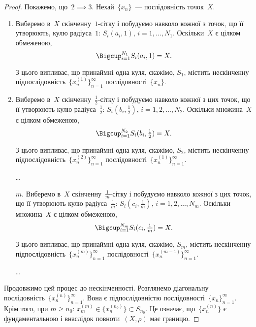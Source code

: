 \begin{proof}
Покажемо, що~$2 \implies 3$. Нехай~$\{x_n\}$~--- послідовність
точок~$X$.
\begin{enumerate}
\item Виберемо в~$X$ скінченну~$1$-сітку і побудуємо навколо
кожної з точок, що її утворюють, кулю радіуса~$1$:
$S_i(a_i, 1)$, $i = 1, \dots, N_1$. Оскільки~$X$ є цілком обмеженою,
\begin{equation*}
    \Bigcup_{i = 1}^{N_1} S_i(a_i, 1) = X.
\end{equation*}

З цього випливає, що принаймні одна куля, скажімо,
$S_1$, містить нескінченну підпослідовність~$\{x_n^{(1)}\}_{n = 1}^\infty$
послідовності~$\{x_n\}$.

\item Виберемо в~$X$ скінченну~$\frac{1}{2}$-сітку і побудуємо навколо
кожної з цих точок, що її утворюють кулю радіуса~$\frac{1}{2}$:
$S_i(b_i, \frac{1}{2})$, $i = 1, 2, \dots, N_2$. Оскільки множина~$X$ є цілком
обмеженою,
\begin{equation*}
    \Bigcup_{i = 1}^{N_2} S_i(b_i, \tfrac{1}{2}) = X.
\end{equation*}

З цього випливає, що принаймні одна куля, скажімо,
$S_2$, містить нескінченну підпослідовність~$\{x_n^{(2)}\}_{n = 1}^\infty$
послідовності~$\{x_n^{(1)}\}_{n = 1}^\infty$.

\dots

\item[$m$.] Виберемо в~$X$ скінченну~$\frac{1}{m}$-сітку і побудуємо
навколо кожної з цих точок, що її утворюють кулю
радіуса~$\frac{1}{m}$: $S_i(c_i, \frac{1}{m})$, $i = 1, 2, \dots, N_m$. Оскільки
множина~$X$ є цілком обмеженою,
\begin{equation*}
    \Bigcup_{i = 1}^{N_m} S_i(c_i, \tfrac{1}{m}) = X.
\end{equation*}

З цього випливає, що принаймні одна куля, скажімо,
$S_m$, містить нескінченну підпослідовність~$\{x_n^{(m)}\}_{n = 1}^\infty$
послідовності~$\{x_n^{(m - 1)}\}_{n = 1}^\infty$.

\dots
\end{enumerate}

Продовжимо цей процес до нескінченності.
Розглянемо діагональну послідовність~$\{x_n^(n)\}_{n = 1}^\infty$. Вона є
підпослідовністю послідовності~$\{x_n\}_{n = 1}^\infty$. Крім того, при
$m \ge n_0$: $x_m^{(m)} \in \{x_n^{(n_0)}\} \subset S_{n_0}$.
Це означає, що~$\{x_n^{(n)}\}$ є
фундаментальною і внаслідок повноти~$(X, \rho)$ має границю.


\end{proof}
